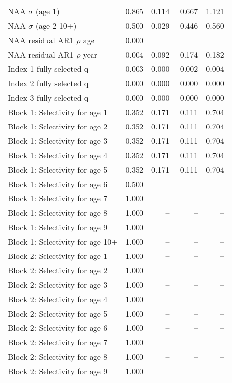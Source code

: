 \documentclass[
]{article}
\begin{document}
\begin{landscape}
\begin{longtable}[t]{lrrrr}
\endfoot
\bottomrule
\endlastfoot
NAA $\sigma$ (age 1) & 0.865 & 0.114 & 0.667 & 1.121\\
NAA $\sigma$ (age 2-10+) & 0.500 & 0.029 & 0.446 & 0.560\\
NAA residual AR1 $\rho$ age & 0.000 & -- & -- & --\\
NAA residual AR1 $\rho$ year & 0.004 & 0.092 & -0.174 & 0.182\\
Index 1 fully selected q & 0.003 & 0.000 & 0.002 & 0.004\\
\addlinespace
Index 2 fully selected q & 0.000 & 0.000 & 0.000 & 0.000\\
Index 3 fully selected q & 0.000 & 0.000 & 0.000 & 0.000\\
Block 1: Selectivity for age 1 & 0.352 & 0.171 & 0.111 & 0.704\\
Block 1: Selectivity for age 2 & 0.352 & 0.171 & 0.111 & 0.704\\
Block 1: Selectivity for age 3 & 0.352 & 0.171 & 0.111 & 0.704\\
\addlinespace
Block 1: Selectivity for age 4 & 0.352 & 0.171 & 0.111 & 0.704\\
Block 1: Selectivity for age 5 & 0.352 & 0.171 & 0.111 & 0.704\\
Block 1: Selectivity for age 6 & 0.500 & -- & -- & --\\
Block 1: Selectivity for age 7 & 1.000 & -- & -- & --\\
Block 1: Selectivity for age 8 & 1.000 & -- & -- & --\\
\addlinespace
Block 1: Selectivity for age 9 & 1.000 & -- & -- & --\\
Block 1: Selectivity for age 10+ & 1.000 & -- & -- & --\\
Block 2: Selectivity for age 1 & 1.000 & -- & -- & --\\
Block 2: Selectivity for age 2 & 1.000 & -- & -- & --\\
Block 2: Selectivity for age 3 & 1.000 & -- & -- & --\\
\addlinespace
Block 2: Selectivity for age 4 & 1.000 & -- & -- & --\\
Block 2: Selectivity for age 5 & 1.000 & -- & -- & --\\
Block 2: Selectivity for age 6 & 1.000 & -- & -- & --\\
Block 2: Selectivity for age 7 & 1.000 & -- & -- & --\\
Block 2: Selectivity for age 8 & 1.000 & -- & -- & --\\
\addlinespace
Block 2: Selectivity for age 9 & 1.000 & -- & -- & --\\

\end{longtable}
\end{landscape}
\end{document}
